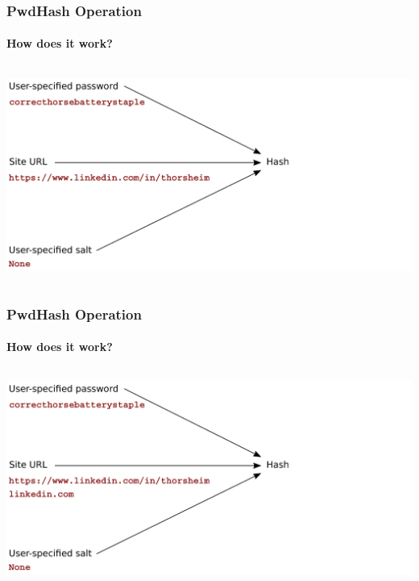 \documentclass[handout, notes=hide]{beamer}
\begin{document}
\begin{frame}
\frametitle{PwdHash Operation}
\framesubtitle{How does it work?}
\setlength{\parskip}{0.5em}

\begin{columns}[T]
\begin{column}[T]{1.1\textwidth}
\vspace{0.0em}
\includegraphics[width=1.0\textwidth]{process02}
\end{column}
\end{columns}


\end{frame}
\note{
\setlength{\parskip}{0.5em}
}


\begin{frame}
\frametitle{PwdHash Operation}
\framesubtitle{How does it work?}
\setlength{\parskip}{0.5em}

\begin{columns}[T]
\begin{column}[T]{1.1\textwidth}
\vspace{0.0em}
\includegraphics[width=1.0\textwidth]{process03}
\end{column}
\end{columns}


\end{frame}
\note{
\setlength{\parskip}{0.5em}
}
\end{document}
